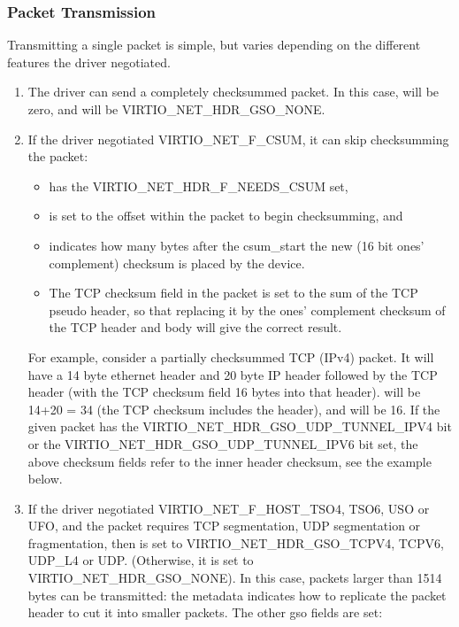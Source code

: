 \subsubsection{Packet Transmission}\label{sec:Device Types / Network Device / Device Operation / Packet Transmission}

Transmitting a single packet is simple, but varies depending on
the different features the driver negotiated.

\begin{enumerate}
\item The driver can send a completely checksummed packet.  In this case,
   will be zero, and  will be VIRTIO_NET_HDR_GSO_NONE.

\item If the driver negotiated VIRTIO_NET_F_CSUM, it can skip
  checksumming the packet:
  \begin{itemize}
  \item {} has the VIRTIO_NET_HDR_F_NEEDS_CSUM set,

  \item {} is set to the offset within the packet to begin checksumming,
    and

  \item {} indicates how many bytes after the csum_start the
    new (16 bit ones' complement) checksum is placed by the device.

  \item The TCP checksum field in the packet is set to the sum
    of the TCP pseudo header, so that replacing it by the ones'
    complement checksum of the TCP header and body will give the
    correct result.
  \end{itemize}

\begin{note}
For example, consider a partially checksummed TCP (IPv4) packet.
It will have a 14 byte ethernet header and 20 byte IP header
followed by the TCP header (with the TCP checksum field 16 bytes
into that header).  will be 14+20 = 34 (the TCP
checksum includes the header), and  will be 16.
If the given packet has the VIRTIO_NET_HDR_GSO_UDP_TUNNEL_IPV4 bit or the
VIRTIO_NET_HDR_GSO_UDP_TUNNEL_IPV6 bit set,
the above checksum fields refer to the inner header checksum, see
the example below.
\end{note}

\item If the driver negotiated
  VIRTIO_NET_F_HOST_TSO4, TSO6, USO or UFO, and the packet requires
  TCP segmentation, UDP segmentation or fragmentation, then 
  is set to VIRTIO_NET_HDR_GSO_TCPV4, TCPV6, UDP_L4 or UDP.
  (Otherwise, it is set to VIRTIO_NET_HDR_GSO_NONE). In this
  case, packets larger than 1514 bytes can be transmitted: the
  metadata indicates how to replicate the packet header to cut it
  into smaller packets. The other gso fields are set:


\end{enumerate}
